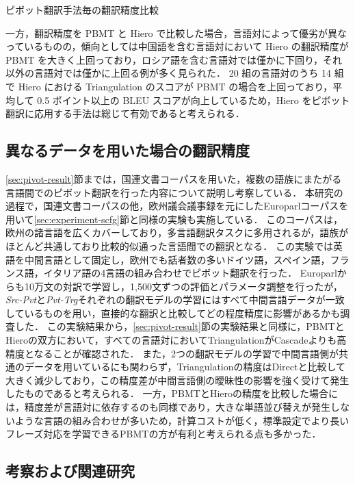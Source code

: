 \documentclass[japanese]{jnlp_1.4}
\begin{document}
\begin{table}[p]
\caption{ピボット翻訳手法毎の翻訳精度比較}
\label{tab:pivot-pbmt-scfg}

\end{table}

一方，翻訳精度を PBMT と Hiero で比較した場合，言語対によって優劣が異なっているものの，傾向としては中国語を含む言語対において Hiero の翻訳精度が PBMT を大きく上回っており，ロシア語を含む言語対では僅かに下回り，それ以外の言語対では僅かに上回る例が多く見られた．
20 組の言語対のうち 14 組で Hiero における Triangulation のスコアが PBMT の場合を上回っており，平均して 0.5 ポイント以上の BLEU スコアが向上しているため，Hiero をピボット翻訳に応用する手法は総じて有効であると考えられる．


\subsection{異なるデータを用いた場合の翻訳精度}
\label{sec:pivot-europarl}

\ref{sec:pivot-result}節までは，国連文書コーパスを用いた，複数の語族にまたがる言語間でのピボット翻訳を行った内容について説明し考察している．
本研究の過程で，国連文書コーパスの他，欧州議会議事録を元にしたEuroparlコーパス\cite{koehn05europarl}を用いて\ref{sec:experiment-scfg}節と同様の実験も実施している．
このコーパスは，欧州の諸言語を広くカバーしており，多言語翻訳タスクに多用されるが，語族がほとんど共通しており比較的似通った言語間での翻訳となる．
この実験では英語を中間言語として固定し，欧州でも話者数の多いドイツ語，スペイン語，フランス語，イタリア語の4言語の組み合わせでピボット翻訳を行った．
Europarlからも10万文の対訳で学習し，1,500文ずつの評価とパラメータ調整を行ったが，\textit{Src-Pvt}と\textit{Pvt-Trg}それぞれの翻訳モデルの学習にはすべて中間言語データが一致しているものを用い，直接的な翻訳と比較してどの程度精度に影響があるかも調査した．
この実験結果から，\ref{sec:pivot-result}節の実験結果と同様に，PBMTとHieroの双方において，すべての言語対においてTriangulationがCascadeよりも高精度となることが確認された．
また，2つの翻訳モデルの学習で中間言語側が共通のデータを用いているにも関わらず，Triangulationの精度はDirectと比較して大きく減少しており，この精度差が中間言語側の曖昧性の影響を強く受けて発生したものであると考えられる．
一方，PBMTとHieroの精度を比較した場合には，精度差が言語対に依存するのも同様であり，大きな単語並び替えが発生しないような言語の組み合わせが多いため，計算コストが低く，標準設定でより長いフレーズ対応を学習できるPBMTの方が有利と考えられる点も多かった．


\subsection{考察および関連研究}
\end{document}
